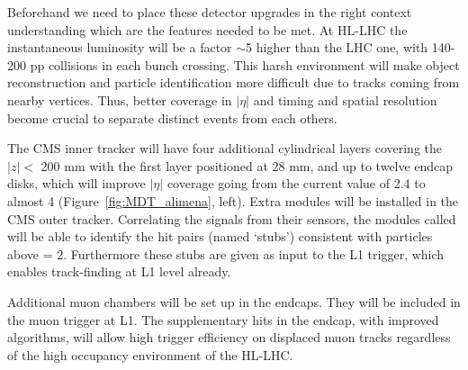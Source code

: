 Beforehand we need to place these detector upgrades in the right context
understanding which are the features needed to be met. At HL-LHC the
instantaneous luminosity will be a factor $\sim$5 higher than the LHC
one, with 140-200 pp collisions in each bunch crossing. This harsh
environment will make object reconstruction and particle
identification more difficult due to tracks coming from nearby
vertices. Thus, better coverage in $|\eta|$ and timing and spatial
resolution become crucial to
separate distinct events from each others. 


The CMS inner tracker will have four additional cylindrical 
layers covering the $|z| < $ 200 mm with the first layer positioned at
28 mm, and up to twelve endcap
disks, which will improve $|\eta|$ coverage going from the current
value of 2.4 to almost 4 (Figure~\ref{fig:MDT_alimena}, left).
Extra modules will be installed in
the CMS outer tracker. Correlating the signals from their sensors, the modules called \pt will be able to identify
the hit pairs (named ‘stubs’) consistent with particles above \pt =
2\GeV. Furthermore these stubs are given as input to the L1 trigger, which enables track-finding
at L1 level already. 

Additional muon chambers will be set up in the endcaps. They will be included in
the muon trigger at L1. The supplementary hits in the
endcap, with improved algorithms, will allow high trigger efficiency 
on displaced muon tracks regardless of the high occupancy environment of the HL-LHC.
 

